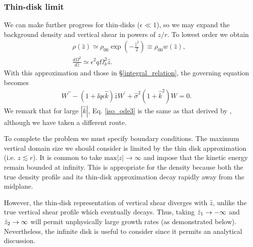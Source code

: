 \subsubsection{Thin-disk limit}
We can make further progress for thin-disks ($\epsilon\ll1$), 
so we may expand the background density and vertical shear in powers
of $z/r$. To lowest order we obtain 
\begin{align}
  &\rho(\hat{z}) \simeq \rho_{00}
  \exp{\left(-\frac{\hat{z}^2}{2}\right)} \equiv \rho_{00}w(\hat{z}),\label{thin_dens}\\
  &\frac{d\Omega^2}{d\hat{z}} \simeq \epsilon^2q\Omega_k^2\hat{z}. \label{thin_vshear}
\end{align}
With this approximation and those in \S\ref{integral_relation}, the
governing equation becomes 
\begin{align}\label{iso_ode3}
  W^{\prime\prime} - \left(1 + \ii q\epsilon
    \hat{k}\right)\hat{z}W^\prime  +
  \hat{\sigma}^2\left(1+\hat{k}^2\right)W = 
  0.
\end{align}
We remark that for large $|\hat{k}|$, Eq. \ref{iso_ode3} is the same as
that derived by \cite{nelson13}, although we have taken a different
route.  

To complete the problem we must specify boundary conditions. The
maximum vertical domain size we should consider is limited by the thin disk
approximation (i.e. $z\lesssim r$). It is common to take $\mathrm{max}|z|\to\infty$
and impose that the kinetic  energy remain bounded at infinity.  This
is appropriate for the density because both the true density profile
and its thin-disk approximation decay rapidly away from the midplane.   

However, the thin-disk representation of vertical shear diverges with 
$\hat{z}$, unlike the true vertical shear profile which eventually
decays.  Thus, taking $\hat{z}_1\to -\infty$ and $\hat{z}_2\to\infty$ will permit unphysically large growth
rates (as demonstrated below). Nevertheless, the infinite disk is
useful to consider since it permits an analytical discussion. 

